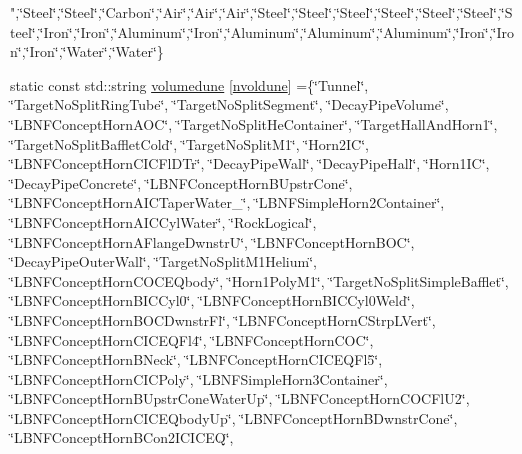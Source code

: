 \begin{DoxyCompactItemize}
"{},\char`\"{}Steel\char`\"{},\char`\"{}Steel\char`\"{},\char`\"{}Carbon\char`\"{},\char`\"{}Air\char`\"{},\char`\"{}Air\char`\"{},\char`\"{}Air\char`\"{},\char`\"{}Steel\char`\"{},\char`\"{}Steel\char`\"{},\char`\"{}Steel\char`\"{},\char`\"{}Steel\char`\"{},\char`\"{}Steel\char`\"{},\char`\"{}Steel\char`\"{},\char`\"{}Steel\char`\"{},\char`\"{}Iron\char`\"{},\char`\"{}Iron\char`\"{},\char`\"{}Aluminum\char`\"{},\char`\"{}Iron\char`\"{},\char`\"{}Aluminum\char`\"{},\char`\"{}Aluminum\char`\"{},\char`\"{}Aluminum\char`\"{},\char`\"{}Iron\char`\"{},\char`\"{}Iron\char`\"{},\char`\"{}Iron\char`\"{},\char`\"{}Water\char`\"{},\char`\"{}Water\char`\"{}\}
\item 
static const std\-::string \hyperlink{namespace_i_map_a560c5dc183178a2e9d826463d3973c47}{volumedune} \mbox{[}\hyperlink{namespace_i_map_a1c9b3e0953e2482ba19063292d111bb2}{nvoldune}\mbox{]} =\{\char`\"{}Tunnel\char`\"{}, \char`\"{}Target\-No\-Split\-Ring\-Tube\char`\"{}, \char`\"{}Target\-No\-Split\-Segment\char`\"{}, \char`\"{}Decay\-Pipe\-Volume\char`\"{}, \char`\"{}L\-B\-N\-F\-Concept\-Horn\-A\-O\-C\char`\"{}, \char`\"{}Target\-No\-Split\-He\-Container\char`\"{}, \char`\"{}Target\-Hall\-And\-Horn1\char`\"{}, \char`\"{}Target\-No\-Split\-Bafflet\-Cold\char`\"{}, \char`\"{}Target\-No\-Split\-M1\char`\"{}, \char`\"{}Horn2\-I\-C\char`\"{}, \char`\"{}L\-B\-N\-F\-Concept\-Horn\-C\-I\-C\-Fl\-D\-Tr\char`\"{}, \char`\"{}Decay\-Pipe\-Wall\char`\"{}, \char`\"{}Decay\-Pipe\-Hall\char`\"{}, \char`\"{}Horn1\-I\-C\char`\"{}, \char`\"{}Decay\-Pipe\-Concrete\char`\"{}, \char`\"{}L\-B\-N\-F\-Concept\-Horn\-B\-Upstr\-Cone\char`\"{}, \char`\"{}L\-B\-N\-F\-Concept\-Horn\-A\-I\-C\-Taper\-Water\-\_\char`\"{}, \char`\"{}L\-B\-N\-F\-Simple\-Horn2\-Container\char`\"{}, \char`\"{}L\-B\-N\-F\-Concept\-Horn\-A\-I\-C\-Cyl\-Water\char`\"{}, \char`\"{}Rock\-Logical\char`\"{}, \char`\"{}L\-B\-N\-F\-Concept\-Horn\-A\-Flange\-Dwnstr\-U\char`\"{}, \char`\"{}L\-B\-N\-F\-Concept\-Horn\-B\-O\-C\char`\"{}, \char`\"{}Decay\-Pipe\-Outer\-Wall\char`\"{}, \char`\"{}Target\-No\-Split\-M1\-Helium\char`\"{}, \char`\"{}L\-B\-N\-F\-Concept\-Horn\-C\-O\-C\-E\-Qbody\char`\"{}, \char`\"{}Horn1\-Poly\-M1\char`\"{}, \char`\"{}Target\-No\-Split\-Simple\-Bafflet\char`\"{}, \char`\"{}L\-B\-N\-F\-Concept\-Horn\-B\-I\-C\-Cyl0\char`\"{}, \char`\"{}L\-B\-N\-F\-Concept\-Horn\-B\-I\-C\-Cyl0\-Weld\char`\"{}, \char`\"{}L\-B\-N\-F\-Concept\-Horn\-B\-O\-C\-Dwnstr\-Fl\char`\"{}, \char`\"{}L\-B\-N\-F\-Concept\-Horn\-C\-Strp\-L\-Vert\char`\"{}, \char`\"{}L\-B\-N\-F\-Concept\-Horn\-C\-I\-C\-E\-Q\-Fl4\char`\"{}, \char`\"{}L\-B\-N\-F\-Concept\-Horn\-C\-O\-C\char`\"{}, \char`\"{}L\-B\-N\-F\-Concept\-Horn\-B\-Neck\char`\"{}, \char`\"{}L\-B\-N\-F\-Concept\-Horn\-C\-I\-C\-E\-Q\-Fl5\char`\"{}, \char`\"{}L\-B\-N\-F\-Concept\-Horn\-C\-I\-C\-Poly\char`\"{}, \char`\"{}L\-B\-N\-F\-Simple\-Horn3\-Container\char`\"{}, \char`\"{}L\-B\-N\-F\-Concept\-Horn\-B\-Upstr\-Cone\-Water\-Up\char`\"{}, \char`\"{}L\-B\-N\-F\-Concept\-Horn\-C\-O\-C\-Fl\-U2\char`\"{}, \char`\"{}L\-B\-N\-F\-Concept\-Horn\-C\-I\-C\-E\-Qbody\-Up\char`\"{}, \char`\"{}L\-B\-N\-F\-Concept\-Horn\-B\-Dwnstr\-Cone\char`\"{}, \char`\"{}L\-B\-N\-F\-Concept\-Horn\-B\-Con2\-I\-C\-I\-C\-E\-Q\char`\"{}, 
\end{DoxyCompactItemize}
